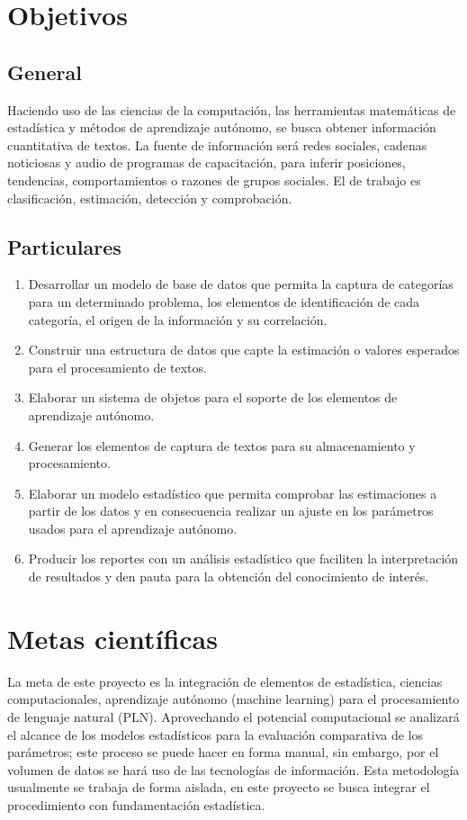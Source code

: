 \section {Objetivos}
\subsection {General}
Haciendo uso de las ciencias de la computación, las herramientas matemáticas de estadística y métodos de aprendizaje autónomo, se busca obtener información cuantitativa de textos. La fuente de información será redes sociales, cadenas noticiosas y audio de programas de capacitación, para inferir posiciones, tendencias, comportamientos o razones de grupos sociales. El de trabajo es clasificación, estimación, detección y comprobación.
\subsection {Particulares}
\begin{enumerate}
    \item Desarrollar un modelo de base de datos que permita la captura de categorías para un determinado problema, los elementos de identificación de cada categoría, el origen de la información y su correlación.
    \item Construir una estructura de datos que capte la estimación o valores esperados para el procesamiento de textos.
    \item Elaborar un sistema de objetos para el soporte de los elementos de aprendizaje autónomo.
    \item Generar los elementos de captura de textos para su almacenamiento y procesamiento.
    \item Elaborar un modelo estadístico que permita comprobar las estimaciones a partir de los datos y en consecuencia realizar un ajuste en los parámetros usados para el aprendizaje autónomo.
    \item Producir los reportes con un análisis estadístico que faciliten la interpretación de resultados y den pauta para la obtención del conocimiento de interés.
\end{enumerate}
\section {Metas científicas}
La meta de este proyecto es la integración de elementos de estadística, ciencias computacionales, aprendizaje autónomo (machine learning) para el procesamiento de lenguaje natural (PLN). Aprovechando el potencial computacional se analizará el alcance de los modelos estadísticos para la evaluación comparativa de los parámetros; este proceso se puede hacer en forma manual, sin embargo, por el volumen de datos se hará uso de las tecnologías de información.
Esta metodología usualmente se trabaja de forma aislada, en este proyecto se busca integrar el procedimiento con fundamentación estadística.